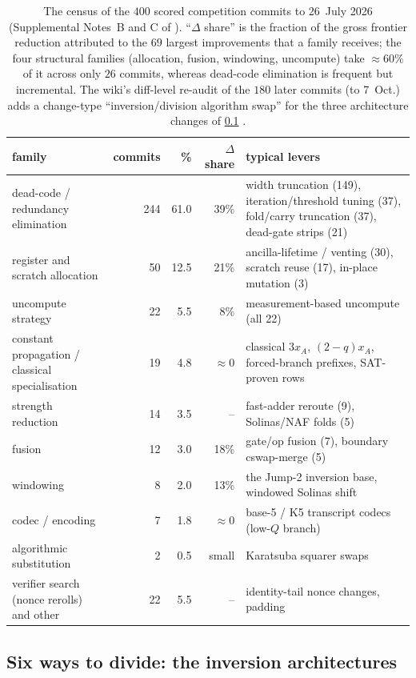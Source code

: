 \begin{table}[H]
\centering\footnotesize
\begin{tabular}{@{}p{4.1cm}rrrp{6.2cm}@{}}
\toprule
family & commits & \% & $\Delta$ share & typical levers\\
\midrule
dead-code / redundancy elimination & 244 & 61.0 & 39\% & width truncation (149), iteration/threshold tuning (37), fold/carry truncation (37), dead-gate strips (21)\\
register and scratch allocation & 50 & 12.5 & 21\% & ancilla-lifetime / venting (30), scratch reuse (17), in-place mutation (3)\\
uncompute strategy & 22 & 5.5 & 8\% & measurement-based uncompute (all 22)\\
constant propagation / classical specialisation & 19 & 4.8 & $\approx0$ & classical $3x_A$, $(2-q)x_A$, forced-branch prefixes, SAT-proven rows\\
strength reduction & 14 & 3.5 & -- & fast-adder reroute (9), Solinas/NAF folds (5)\\
fusion & 12 & 3.0 & 18\% & gate/op fusion (7), boundary cswap-merge (5)\\
windowing & 8 & 2.0 & 13\% & the Jump-2 inversion base, windowed Solinas shift\\
codec / encoding & 7 & 1.8 & $\approx0$ & base-5 / K5 transcript codecs (low-$Q$ branch)\\
algorithmic substitution & 2 & 0.5 & small & Karatsuba squarer swaps\\
\midrule
verifier search (nonce rerolls) and other & 22 & 5.5 & -- & identity-tail nonce changes, padding\\
\bottomrule
\end{tabular}
\caption{The census of the $400$ scored competition commits to 26~July 2026 (Supplemental Notes~B and C of \cite{ecdsafail26}). ``$\Delta$ share'' is the fraction of the gross frontier reduction attributed to the $69$ largest improvements that a family receives; the four structural families (allocation, fusion, windowing, uncompute) take $\approx60\%$ of it across only $26$ commits, whereas dead-code elimination is frequent but incremental. The wiki's diff-level re-audit of the $180$ later commits (to 7~Oct.) adds a change-type ``inversion/division algorithm swap'' for the three architecture changes of \cref{sec:inversions} \cite{ecdsafail-wiki}.}
\label{tab:census}
\end{table}

\subsection{Six ways to divide: the inversion architectures}\label{sec:inversions}


